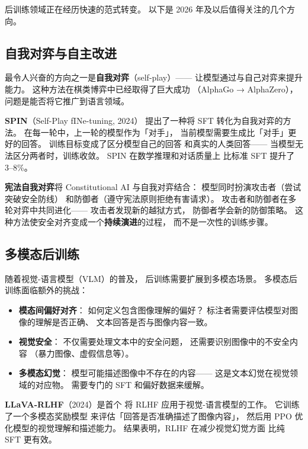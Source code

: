 后训练领域正在经历快速的范式转变。
以下是 2026 年及以后值得关注的几个方向。

\subsection{自我对弈与自主改进}

最令人兴奋的方向之一是\textbf{自我对弈}（self-play）——
让模型通过与自己对弈来提升能力。
这种方法在棋类博弈中已经取得了巨大成功
（AlphaGo → AlphaZero），
问题是能否将它推广到语言领域。

\textbf{SPIN}（Self-Play fINe-tuning, 2024）
提出了一种将 SFT 转化为自我对弈的方法。
在每一轮中，上一轮的模型作为「对手」，
当前模型需要生成比「对手」更好的回答。
训练目标变成了区分模型自己的回答
和真实的人类回答——
当模型无法区分两者时，训练收敛。
SPIN 在数学推理和对话质量上
比标准 SFT 提升了 3--8\%。

\textbf{宪法自我对弈}将 Constitutional AI
与自我对弈结合：
模型同时扮演攻击者（尝试突破安全防线）
和防御者（遵守宪法原则拒绝有害请求）。
攻击者和防御者在多轮对弈中共同进化——
攻击者发现新的越狱方式，
防御者学会新的防御策略。
这种方法使安全对齐变成一个\textbf{持续演进}的过程，
而不是一次性的训练步骤。

\subsection{多模态后训练}

随着视觉-语言模型（VLM）的普及，
后训练需要扩展到多模态场景。
多模态后训练面临额外的挑战：

\begin{itemize}[noitemsep]
  \item \textbf{模态间偏好对齐}：
        如何定义包含图像理解的偏好？
        标注者需要评估模型对图像的理解是否正确、
        文本回答是否与图像内容一致。
  \item \textbf{视觉安全}：
        不仅需要处理文本中的安全问题，
        还需要识别图像中的不安全内容
       （暴力图像、虚假信息等）。
  \item \textbf{多模态幻觉}：
        模型可能描述图像中不存在的内容——
        这是文本幻觉在视觉领域的对应物。
        需要专门的 SFT 和偏好数据来缓解。
\end{itemize}

\textbf{LLaVA-RLHF}（2024）是首个
将 RLHF 应用于视觉-语言模型的工作。
它训练了一个多模态奖励模型
来评估「回答是否准确描述了图像内容」，
然后用 PPO 优化模型的视觉理解和描述能力。
结果表明，RLHF 在减少视觉幻觉方面
比纯 SFT 更有效。

